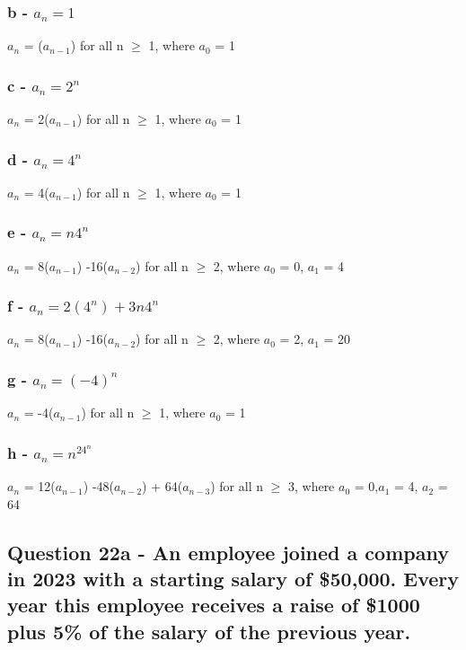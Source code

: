 \documentclass{article}
\begin{document}
\subsubsection[b]{b - $a_n = 1$}
$a_n$ = ($a_{n-1}$) for all n $\geq$ 1, where $a_0$ = 1\\

\subsubsection[c]{c - $a_n = 2^n$}
$a_n$ = 2($a_{n-1}$) for all n $\geq$ 1, where $a_0$ = 1\\

\subsubsection[d]{d - $a_n = 4^n$}
$a_n$ = 4($a_{n-1}$) for all n $\geq$ 1, where $a_0$ = 1\\

\subsubsection[e]{e - $a_n = n4^n$}
$a_n$ = 8($a_{n-1}$) -16($a_{n-2}$) for all n $\geq$ 2, where $a_0$ = 0, $a_1$ = 4\\

\subsubsection[f]{f - $a_n = 2(4^n) + 3n4^n$}
$a_n$ = 8($a_{n-1}$) -16($a_{n-2}$) for all n $\geq$ 2, where $a_0$ = 2, $a_1$ = 20\\

\subsubsection[g]{g - $a_n = (-4)^n$}
$a_n$ = -4($a_{n-1}$) for all n $\geq$ 1, where $a_0$ = 1\\

\subsubsection[h]{h - $a_n = n^24^n$}
$a_n$ = 12($a_{n-1}$) -48($a_{n-2}$) + 64($a_{n-3}$) for all n $\geq$ 3, where $a_0$ = 0,$a_1$ = 4, $a_2$ = 64 \\

\subsection{Question 22a - An employee joined a company in 2023 with a starting salary of \$50,000. Every year this employee receives a raise of \$1000 plus 5\% of the salary of the previous year.}
\end{document}
